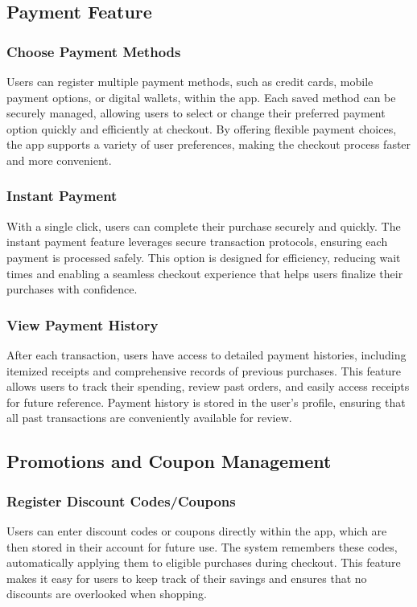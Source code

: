 \documentclass[conference]{IEEEtran}
\begin{document}
\subsection{Payment Feature}
\subsubsection{Choose Payment Methods}
Users can register multiple payment methods, such as credit cards, mobile payment options, or digital wallets, within the app. Each saved method can be securely managed, allowing users to select or change their preferred payment option quickly and efficiently at checkout. By offering flexible payment choices, the app supports a variety of user preferences, making the checkout process faster and more convenient.
\subsubsection{Instant Payment}
With a single click, users can complete their purchase securely and quickly. The instant payment feature leverages secure transaction protocols, ensuring each payment is processed safely. This option is designed for efficiency, reducing wait times and enabling a seamless checkout experience that helps users finalize their purchases with confidence. 
\subsubsection{View Payment History}
After each transaction, users have access to detailed payment histories, including itemized receipts and comprehensive records of previous purchases. This feature allows users to track their spending, review past orders, and easily access receipts for future reference. Payment history is stored in the user’s profile, ensuring that all past transactions are conveniently available for review.
\subsection{Promotions and Coupon Management}
\subsubsection{Register Discount Codes/Coupons}
Users can enter discount codes or coupons directly within the app, which are then stored in their account for future use. The system remembers these codes, automatically applying them to eligible purchases during checkout. This feature makes it easy for users to keep track of their savings and ensures that no discounts are overlooked when shopping. 
\end{document}
